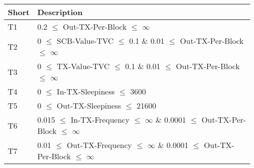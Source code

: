\begin{tabular}{ll}
\toprule
Short &                                                                                Description \\
\midrule
   T1 &                                                  0.2 $\le$ Out-TX-Per-Block $\le$ $\infty$ \\
   T2 &              0 $\le$ SCB-Value-TVC $\le$ 0.1 \& 0.01 $\le$ Out-TX-Per-Block $\le$ $\infty$ \\
   T3 &               0 $\le$ TX-Value-TVC $\le$ 0.1 \& 0.01 $\le$ Out-TX-Per-Block $\le$ $\infty$ \\
   T4 &                                                        0 $\le$ In-TX-Sleepiness $\le$ 3600 \\
   T5 &                                                      0 $\le$ Out-TX-Sleepiness $\le$ 21600 \\
   T6 & 0.015 $\le$ In-TX-Frequency $\le$ $\infty$ \& 0.0001 $\le$ Out-TX-Per-Block $\le$ $\infty$ \\
   T7 & 0.01 $\le$ Out-TX-Frequency $\le$ $\infty$ \& 0.0001 $\le$ Out-TX-Per-Block $\le$ $\infty$ \\
\bottomrule
\end{tabular}
